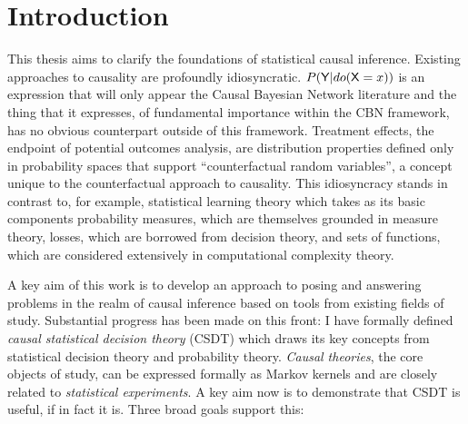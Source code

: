 
\section{Introduction}

This thesis aims to clarify the foundations of statistical causal inference. Existing approaches to causality are profoundly idiosyncratic. $P(\mathsf{Y}|do(\mathsf{X}=x))$ is an expression that will only appear the Causal Bayesian Network literature and the thing that it expresses, of fundamental importance within the CBN framework, has no obvious counterpart outside of this framework. Treatment effects, the endpoint of potential outcomes analysis, are distribution properties defined only in probability spaces that support ``counterfactual random variables'', a concept unique to the counterfactual approach to causality. This idiosyncracy stands in contrast to, for example, statistical learning theory which takes as its basic components probability measures, which are themselves grounded in measure theory, losses, which are borrowed from decision theory, and sets of functions, which are considered extensively in computational complexity theory.

A key aim of this work is to develop an approach to posing and answering problems in the realm of causal inference based on tools from existing fields of study. Substantial progress has been made on this front: I have formally defined \emph{causal statistical decision theory} (CSDT) which draws its key concepts from statistical decision theory and probability theory. \emph{Causal theories}, the core objects of study, can be expressed formally as Markov kernels and are closely related to \emph{statistical experiments}. A key aim now is to demonstrate that CSDT is useful, if in fact it is. Three broad goals support this:

